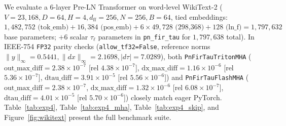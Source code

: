 \documentclass[11pt,a4paper]{article}
\begin{document}
We evaluate a 6-layer Pre-LN Transformer on word-level WikiText-2 ($V=23,168, D=64, H=4, d_{\text{ff}}=256, N=256, B=64$, tied embeddings: $1,482,752 \text{ (tok\_emb)} + 16,384 \text{ (pos\_emb)} + 6 \times 49,728 \text{ (298,368)} + 128 \text{ (ln\_f)} = 1,797,632$ base parameters; $+6$ scalar $\tau_\ell$ parameters in \texttt{pn\_fir\_tau} for $1,797,638$ total). In IEEE-754 \texttt{FP32} parity checks (\texttt{allow\_tf32=False}, reference norms $\|y\|_\infty = 0.5441, \|dx\|_\infty = 2.1698, |d\tau| = 7.0289$), both \texttt{PnFirTauTritonMHA} ($\text{out\_max\_diff} = 2.38\times 10^{-7}$ [rel $4.38\times 10^{-7}$], $\text{dx\_max\_diff} = 1.16\times 10^{-6}$ [rel $5.36\times 10^{-7}$], $\text{dtau\_diff} = 3.91\times 10^{-5}$ [rel $5.56\times 10^{-6}$]) and \texttt{PnFirTauFlashMHA} ($\text{out\_max\_diff} = 2.38\times 10^{-7}$, $\text{dx\_max\_diff} = 1.32\times 10^{-6}$ [rel $6.08\times 10^{-7}$], $\text{dtau\_diff} = 4.01\times 10^{-5}$ [rel $5.70\times 10^{-6}$]) closely match eager PyTorch. Table~\ref{tab:exp4}, Table~\ref{tab:exp4_mha}, Table~\ref{tab:exp4_skip}, and Figure~\ref{fig:wikitext} present the full benchmark suite.
\end{document}

